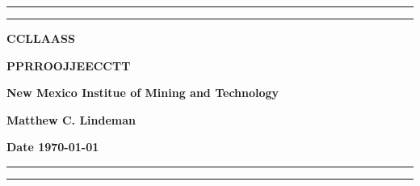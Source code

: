 \documentclass{report}
\begin{document}
\begin{titlepage}
    \begin{center}
        \vspace{0.25cm}
        \hrule
        \vspace{0.1cm}
        \hrule
        \vspace{0.25cm}
        {\LARGE{\textbf{CCLLAASS}}}
        \par
        \vspace{0.25cm}
        {\large{\textbf{PPRROOJJEECCTT}}}
        \par
        \vspace{0.25cm}
        {\large{\textbf{New Mexico Institue of Mining and Technology}}}
        \par
        \vspace{0.25cm}
        {\large{\textbf{Matthew C. Lindeman}}}
        \par
        \vspace{0.25cm}
        {\large{\textbf{Date \today}}}
        \vspace{0.25cm}
        \hrule
        \vspace{0.1cm}
        \hrule
        \vfill
    \end{center}
\end{titlepage}
\end{document}
